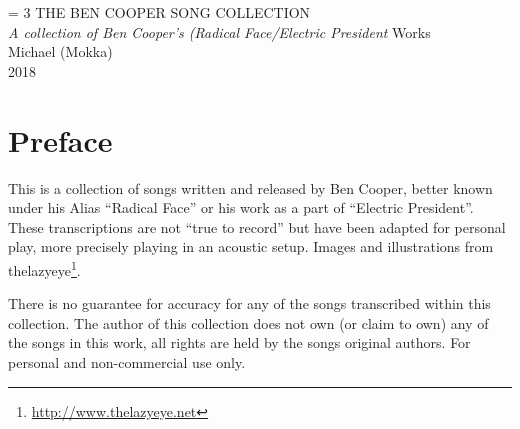 \documentclass[sans, english]{songbook}
\begin{document}
 \frontmatter
 {\begingroup%
  \drop = 3\baselineskip
  \centering
  \vspace*{4cm}\null
  \vspace*{\drop}
  {\fontsize{45}{55}\selectfont THE BEN COOPER SONG COLLECTION}\\[2cm]
  {\Large\itshape A collection of Ben Cooper's (Radical Face/Electric President} Works\\[1cm]
  \vfill
  {\Large Michael (Mokka)}\\
  \vspace*{\drop}
  {\scshape 2018}\par
  \vspace*{\drop}
 \endgroup}

 
 \maketoc
 \newpage
 \vspace*{1cm}
 
 \chapter*{Preface}
 
 \begin{spacing}{1.5}
 \fontsize{14}{16}\selectfont
  This is a collection of songs written and released by Ben Cooper, better known under his Alias ``Radical Face'' or his work as a part of ``Electric President''. These transcriptions are not ``true to record'' but have been adapted for personal play, more precisely playing in an acoustic setup. Images and illustrations from thelazyeye\footnote{\url{http://www.thelazyeye.net}}.\par There is no guarantee for accuracy for any of the songs transcribed within this collection. The author of this collection does not own (or claim to own) any of the songs in this work, all rights are held by the songs original authors. For personal and non-commercial use only.
 \end{spacing}
 
 \mainmatter
 
 
 \newpage
 
 
 
 
 
\end{document}
